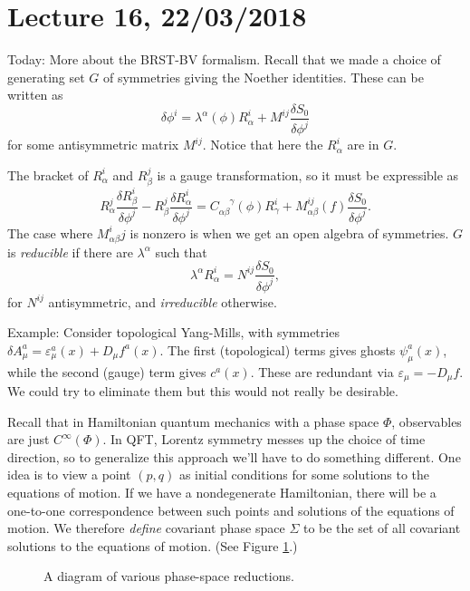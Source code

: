\section*{Lecture 16, 22/03/2018}
Today: More about the BRST-BV formalism.
Recall that we made a choice of generating set $G$ of symmetries giving the Noether identities.
These can be written as
\[
\delta \phi^i = \lambda^\alpha(\phi) R_\alpha^i + M^{ij} \frac{\delta S_0}{\delta \phi^j}
\]
for some antisymmetric matrix $M^{ij}$.
Notice that here the $R_\alpha^i$ are in $G$.

The bracket of $R_\alpha^i$ and $R_\beta^j$ is a gauge transformation, so it must be expressible as
\[
R_\alpha^j \frac{\delta R_\beta^i}{\delta \phi^j} - R_\beta^j \frac{\delta R_\alpha^i}{\delta \phi^j} = C_{\alpha \beta}^{\phantom{\alpha \beta} \gamma}(\phi) R_\gamma^i + M_{\alpha \beta}^{ij}(f) \frac{\delta S_0}{\delta \phi^j}.
\]
The case where $M_{\alpha \beta}^ij$ is nonzero is when we get an open algebra of symmetries.
$G$ is \emph{reducible} if there are $\lambda^\alpha$ such that
\[
\lambda^\alpha R_\alpha^i = N^{ij} \frac{\delta S_0}{\delta \phi^j},
\]
for $N^{ij}$ antisymmetric, and \emph{irreducible} otherwise.

Example: Consider topological Yang-Mills, with symmetries $\delta A_\mu^a = \varepsilon_\mu^a(x) + D_\mu f^a(x)$.
The first (topological) terms gives ghosts $\psi_\mu^a(x)$, while the second (gauge) term gives $c^a(x)$.
These are redundant via $\varepsilon_\mu = -D_\mu f$.
We could try to eliminate them but this would not really be desirable.

Recall that in Hamiltonian quantum mechanics with a phase space $\Phi$, observables are just $C^\infty(\Phi)$.
In QFT, Lorentz symmetry messes up the choice of time direction, so to generalize this approach we'll have to do something different.
One idea is to view a point $(p,q)$ as initial conditions for some solutions to the equations of motion.
If we have a nondegenerate Hamiltonian, there will be a one-to-one correspondence between such points and solutions of the equations of motion.
We therefore \emph{define} covariant phase space $\Sigma$ to be the set of all covariant solutions to the equations of motion.
(See Figure \ref{fig:phase-space}.)

\begin{figure}[h]
\caption{A diagram of various phase-space reductions.}
\label{fig:phase-space}
\end{figure}

